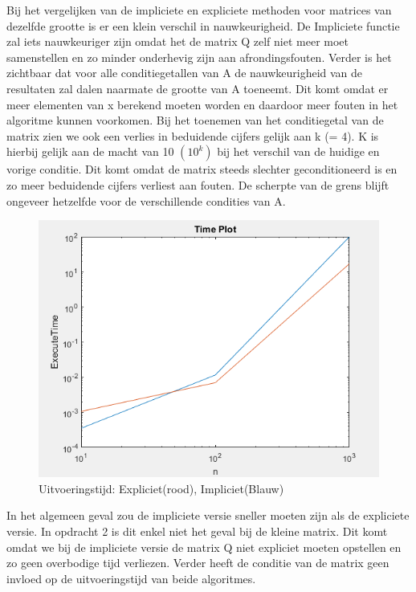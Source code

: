 \documentclass{Numerieke}
\begin{document}
Bij het vergelijken van de impliciete en expliciete methoden voor matrices van dezelfde grootte is er een klein verschil in nauwkeurigheid. De Impliciete functie zal iets nauwkeuriger zijn omdat het de matrix Q zelf niet meer moet samenstellen en zo minder onderhevig zijn aan afrondingsfouten. Verder is het zichtbaar dat voor alle conditiegetallen van A de nauwkeurigheid van de resultaten zal dalen naarmate de grootte van A toeneemt. Dit komt omdat er meer elementen van x berekend moeten worden en daardoor meer fouten in het algoritme kunnen voorkomen. \newline Bij het toenemen van het conditiegetal van de matrix zien we ook een verlies in beduidende cijfers gelijk aan k (= 4). K is hierbij gelijk aan de macht van 10 $(10^k)$ bij het verschil van de huidige en vorige conditie. Dit komt omdat de matrix steeds slechter geconditioneerd is en zo meer beduidende cijfers verliest aan fouten. \newline 
De scherpte van de grens blijft ongeveer hetzelfde voor de verschillende condities van A.  
\begin{figure}[H]
	\caption{Uitvoeringstijd: Expliciet(rood), Impliciet(Blauw) }
	\includegraphics[scale=0.6]{HouseholderTimePlot.png}
	\centering
\end{figure}
\newline
In het algemeen geval zou de impliciete versie sneller moeten zijn als de expliciete versie. In opdracht 2 is dit enkel niet het geval bij de kleine matrix. Dit komt omdat we bij de impliciete versie de matrix Q niet expliciet moeten opstellen en zo geen overbodige tijd verliezen. Verder heeft de conditie van de matrix geen invloed op de uitvoeringstijd van beide algoritmes. 
\end{document}
